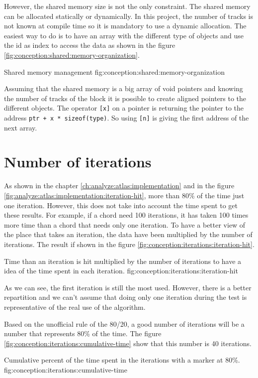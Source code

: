 However, the shared memory size is not the only constraint.
The shared memory can be allocated statically or dynamically.
In this project, the number of tracks is not known at compile time so it is
mandatory to use a dynamic allocation.
The easiest way to do is to have an array with the different type of objects and
use the id as index to access the data as shown in the figure \ref{fig:conception:shared:memory-organization}.

        {Shared memory management}
        {fig:conception:shared:memory-organization}

Assuming that the shared memory is a big array of void pointers and knowing the
number of tracks of the block it is possible to create aligned pointers to the
different objects.
The operator \texttt{[x]} on a pointer is returning the pointer to the address
\texttt{ptr + x * sizeof(type)}. So using \texttt{[n]} is giving the first
address of the next array.


\section{Number of iterations}
\label{ch:conception:iterations}

As shown in the chapter \ref{ch:analyze:atlas:implementation} and in the figure
\ref{fig:analyze:atlas:implementation:iteration-hit}, more than 80\% of the time
just one iteration.
However, this does not take into account the time spent to get these results.
For example, if a chord need 100 iterations, it has taken 100 times more time
than a chord that needs only one iteration.
To have a better view of the place that takes an iteration, the data have been
multiplied by the number of iterations.
The result if shown in the figure \ref{fig:conception:iterations:iteration-hit}.

        {Time than an iteration is hit multiplied by the number of iterations to
        have a idea of the time spent in each iteration.}
        {fig:conception:iterations:iteration-hit}

As we can see, the first iteration is still the most used.
However, there is a better repartition and we can't assume that doing only one
iteration during the test is representative of the real use of the algorithm.

Based on the unofficial rule of the 80/20, a good number of iterations
will be a number that represents 80\% of the time.
The figure \ref{fig:conception:iterations:cumulative-time} show that this number
is 40 iterations.

        {Cumulative percent of the time spent in the iterations with a marker at
        80\%.}
        {fig:conception:iterations:cumulative-time}